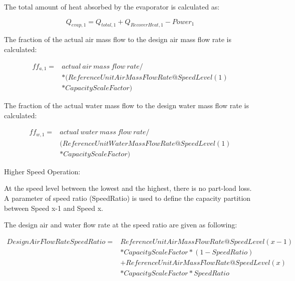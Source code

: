 The total amount of heat absorbed by the evaporator is calculated as:

\begin{equation}
{{Q}_{evap,1}} = {Q_{total,1}} + {{Q}_{RecoverHeat,1}} - Powe{r_1}
\end{equation}

The fraction of the actual air mass flow to the design air mass flow rate is calculated:

\begin{equation}
\begin{array}{rl}
  ff_{a,1} =& actual~air~mass~flow~rate/ \\
  &*(ReferenceUnitAirMassFlowRate@SpeedLevel(1) \\
  &*CapacityScaleFactor)
\end{array}
\end{equation}

The fraction of the actual water mass flow to the design water mass flow rate is calculated:

\begin{equation}
\begin{array}{rl}
  ff_{w,1} =& actual~water~mass~flow~rate/ \\
  &(ReferenceUnitWaterMassFlowRate@SpeedLevel(1) \\
  &*CapacityScaleFactor)
\end{array}
\end{equation}

Higher Speed Operation:

At the speed level between the lowest and the highest, there is no part-load loss. A parameter of speed ratio (SpeedRatio) is used to define the capacity partition between Speed x-1 and Speed x.

The design air and water flow rate at the speed ratio are given as following:

\begin{equation}
  \begin{array}{rl}
  DesignAirFlowRateSpeedRatio =& ReferenceUnitAirMassFlowRate@SpeedLevel\left( {x - 1} \right) \\
                              &* CapacityScaleFactor * \left(1-SpeedRatio\right) \\
                              &+ ReferenceUnitAirMassFlowRate@SpeedLevel\left( x \right) \\
                              &* CapacityScaleFactor * SpeedRatio
  \end{array}
\end{equation}

